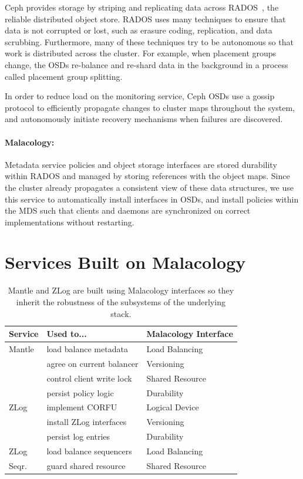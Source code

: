 \documentclass[preprint]{sigplanconf-eurosys}
\begin{document}
Ceph provides storage by striping and replicating data across
RADOS~\cite{weil_rados_2007}, the reliable distributed object store. RADOS
uses many techniques to ensure that data is not corrupted or lost, such as
erasure coding, replication, and data scrubbing. Furthermore, many of these
techniques try to be autonomous so that work is distributed across the
cluster. For example, when placement groups change, the OSDs re-balance and
re-shard data in the background in a process called placement group splitting.

In order to reduce load on the monitoring service, Ceph OSDs use a gossip
protocol to efficiently propagate changes to cluster maps throughout the
system, and autonomously initiate recovery mechanisms when failures are
discovered.

\paragraph*{Malacology:} Metadata service policies and object storage
interfaces are stored durability within RADOS and managed by storing references
with the object maps. Since the cluster already propagates a consistent view of
these data structures, we use this service to automatically install interfaces
in OSDs, and install policies within the MDS such that clients and daemons are
synchronized on correct implementations without restarting.

\section{Services Built on Malacology}
\label{sec:services}
\label{services-built-on-malacology}

\label{services}
\begin{table}
\centering
\begin{tabular}{  l | l | l }
\textbf{Service}              &
\textbf{Used to...}           &
\textbf{Malacology Interface} \\ \hline
Mantle & load balance metadata     & Load Balancing  \\
       & agree on current balancer & Versioning      \\ 
       & control client write lock & Shared Resource \\
       & persist policy logic      & Durability      \\ \hline
ZLog   & implement CORFU           & Logical Device  \\ 
       & install ZLog interfaces   & Versioning      \\
       & persist log entries       & Durability      \\ \hline
ZLog   & load balance sequencers   & Load Balancing  \\
Seqr.  & guard shared resource     & Shared Resource \\ 
\end{tabular}
\caption{Mantle and ZLog are built using Malacology interfaces so they inherit the
robustness of the subsystems of the underlying stack.}
\label{table:implementation}
\end{table}
\end{document}
